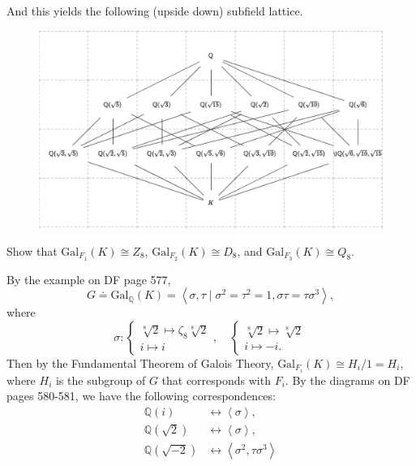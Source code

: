 \documentclass[10pt]{report}
\begin{document}
And this yields the following (upside down) subfield lattice.
\begin{figure}[H]
	\centering
	\includegraphics[scale=0.3]{fig/fld}
\end{figure}

\begin{exer}[DF 14.2: 6]
Show that $\text{Gal}_{F_1}(K)\cong Z_{8}$, $\text{Gal}_{F_2}(K)\cong D_{8}$, and $\text{Gal}_{F_3}(K)\cong Q_8$.
\end{exer}
By the example on DF page 577,
\[
G \doteq \text{Gal}_{\mathbb{Q}}(K)= \left\langle \sigma,\tau \;|\; \sigma^2 =\tau^2=1, \sigma\tau=\tau\sigma^3 \right\rangle,
\] where
\[
\sigma:
\begin{cases}
	\sqrt[8]{2} \mapsto \zeta_8 \sqrt[8]{2} \\
	i \mapsto i
\end{cases}, \quad
\begin{cases}
	\sqrt[8]{2} \mapsto \sqrt[8]{2} \\
	i \mapsto -i.
\end{cases}
\] Then by the Fundamental Theorem of Galois Theory, $\text{Gal}_{F_i}(K) \cong H_i / 1 = H_i$, where $H_i$ is the subgroup of $G$ that corresponds with $F_i$. By the diagrams on DF pages 580-581, we have the following correspondences:
\begin{align*}
	\mathbb{Q}(i) &\leftrightarrow \left\langle \sigma \right\rangle, \\
	\mathbb{Q}(\sqrt{2} ) &\leftrightarrow \left\langle \sigma \right\rangle, \\
	\mathbb{Q}(\sqrt{-2} ) &\leftrightarrow \left\langle \sigma^2, \tau \sigma^3 \right\rangle
\end{align*}
\end{document}
